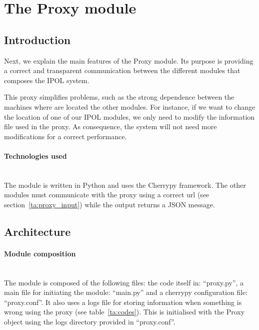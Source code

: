 \section{The Proxy module}

\subsection{Introduction}
\label{sec:proxy_introduction}

Next, we explain the main features of the Proxy module. Its purpose is providing a correct and transparent communication between the different modules that composes the IPOL system. 

This proxy simplifies problems, such as the strong dependence between the machines where are located the other modules. For instance, if we want to change the location of one of our IPOL modules, we only need to modify the information file used in the proxy. As consequence, the system will not need more modifications for a correct performance.

\paragraph{Technologies used} \hspace{0pt} \\
The module is written in Python and uses the Cherrypy framework. The other modules must communicate with the proxy using a correct url (see section~\ref{ta:proxy_input}) while the output returns a JSON message.

\subsection{Architecture}

\paragraph{Module composition} \hspace{0pt} \\
The module is composed of the following files: the code itself in: ``proxy.py'', a main file for initiating the module: ``main.py''  and a cherrypy configuration file: ``proxy.conf''.  
It also uses a logs file for storing information when something is wrong using the proxy (see table~\ref{ta:codes}). This is initialised with the Proxy object using the logs directory provided in ``proxy.conf''.


